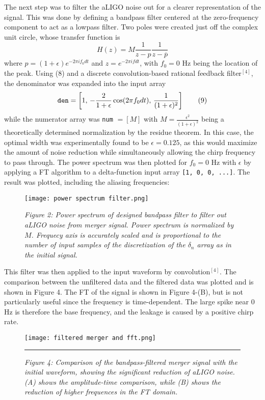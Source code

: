 \documentclass[12pt]{article}
\begin{document}
\begin{multicols}{2}
The next step was to filter the aLIGO noise out for a clearer representation of the signal. This was done by defining a bandpass filter centered at the zero-frequency component to act as a lowpass filter. Two poles were created just off the complex unit circle, whose transfer function is 
\[
    H(z) = M\frac{1}{z-p}  \frac{1}{z-\overline{p}}\tag{8}  
\]
where $p = (1+\epsilon)e^{-2\pi i f_0 dt}$ and $z = e^{-2\pi i f dt}$, with $f_0 = 0$ Hz being the location of the peak. Using (8) and a discrete convolution-based rational feedback filter$^{[4]}$, the denominator was expanded into the input array 
\[
    \verb!den! = \left[1,\, -\frac{2}{1+\epsilon}\cos(2\pi f_0 dt), \, \frac{1}{(1+\epsilon)^2}\right]\tag{9}  
\]
while the numerator array was \verb!num! $= [M]$ with $M = \frac{\epsilon^2}{(1+\epsilon)^2}$ being a theoretically determined normalization by the residue theorem. In this case, the optimal width was experimentally found to be $\epsilon = 0.125$, as this would maximize the amount of noise reduction while simultaneously allowing the chirp frequency to pass through. The power spectrum was then plotted for $f_0 = 0$ Hz with $\epsilon$ by applying a FT algorithm to a delta-function input array \verb![1, 0, 0, ...]!. The result was plotted, including the aliasing frequencies:
\begin{figure}[H]
    \centering
    \texttt{[image: power spectrum filter.png]}
    \caption*{\textit{Figure 2: Power spectrum of designed bandpass filter to filter out aLIGO noise from merger signal. Power spectrum is normalized by $M$. Frequecy axis is accurately scaled and is proportional to the number of input samples of the discretization of the $\delta_n$ array as in the initial signal.}}
\end{figure}
This filter was then applied to the input waveform by convolution$^{[4]}$. The comparison between the unfiltered data and the filtered data was plotted and is shown in Figure 4. The FT of the signal is shown in Figure 4-(B), but is not particularly useful since the frequency is time-dependent. The large spike near $0$ Hz is therefore the base frequency, and the leakage is caused by a positive chirp rate.  

\begin{figure*}[!t]
    \begin{minipage}{0.3\linewidth}
        \texttt{[image: filtered merger and fft.png]}
    \end{minipage}\rule{0.5em}{0pt}%
    \caption*{\textit{Figure 4: Comparison of the bandpass-filtered merger signal with the initial waveform, showing the significant reduction of aLIGO noise. (A) shows the amplitude-time comparison, while (B) shows the reduction of higher frequences in the FT domain.}}
\nd \hrulefill  
\end{figure*}



\end{multicols}
\end{document}
